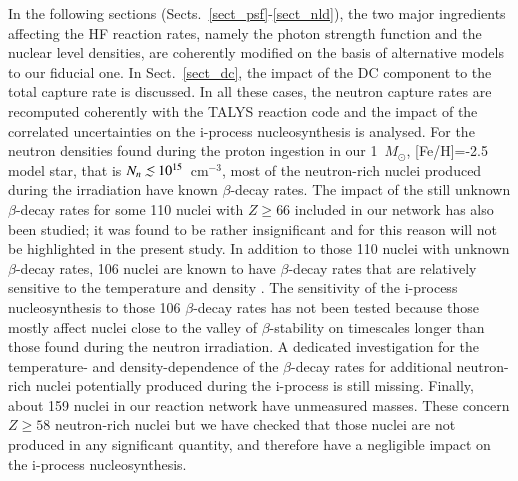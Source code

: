 \documentclass{aa}
\def\la{\,\,\raise0.14em\hbox{$<$}\kern-0.76em\lower0.28em\hbox{$\sim$}\,\,}
\def\Msun{$M_{\odot}$}
\begin{document}
In the following sections (Sects.~\ref{sect_psf}-\ref{sect_nld}), the two major ingredients affecting the HF reaction rates, namely the photon strength function and the nuclear level densities, are coherently modified on the basis of alternative models to our fiducial one. In Sect.~\ref{sect_dc}, the impact of the DC component to the total capture rate is discussed. In all these cases, the neutron capture rates are recomputed coherently with the {\sf TALYS} reaction code and the impact of the correlated uncertainties on the i-process nucleosynthesis is analysed.  For the neutron densities found during the proton ingestion in our 1~\Msun{}, [Fe/H]=-2.5 model star, that is $N_n \la 10^{15}$~cm$^{-3}$, most of the neutron-rich nuclei produced during the irradiation have known $\beta$-decay rates. The impact of the still unknown $\beta$-decay rates for some 110 nuclei with $Z \ge 66$ included in our network has also been studied; it was found to be rather insignificant and for this reason will not be highlighted in the present study.
In addition to those 110 nuclei with unknown $\beta$-decay rates, 106 nuclei are known to have $\beta$-decay rates that are relatively sensitive to the temperature and density \citep{Takahashi87,Goriely99}.  The sensitivity of the i-process nucleosynthesis to those 106 $\beta$-decay rates has not been tested because those mostly affect nuclei close to the valley of $\beta$-stability on timescales longer than those found during the neutron irradiation. A dedicated investigation for the temperature- and density-dependence of the $\beta$-decay rates for additional neutron-rich nuclei potentially produced during the i-process is still missing.
Finally, about 159 nuclei in our reaction network have unmeasured masses. These concern $Z\ge 58$ neutron-rich nuclei but we have checked that those nuclei are not produced in any significant quantity, and therefore have a negligible impact on the i-process nucleosynthesis.
\end{document}
